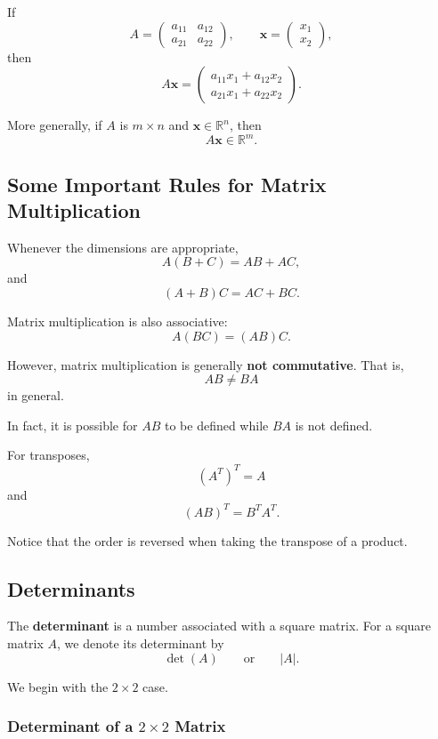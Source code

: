 \documentclass[11pt]{article}
\theoremstyle{definition}
\theoremstyle{plain}
\theoremstyle{remark}
\begin{document}
If
\[
A=
\begin{pmatrix}
a_{11}&a_{12}\\
a_{21}&a_{22}
\end{pmatrix},
\qquad
\mathbf{x}
=
\begin{pmatrix}
x_1\\
x_2
\end{pmatrix},
\]
then
\[
A\mathbf{x}
=
\begin{pmatrix}
a_{11}x_1+a_{12}x_2\\
a_{21}x_1+a_{22}x_2
\end{pmatrix}.
\]

More generally, if $A$ is $m\times n$ and $\mathbf{x}\in\mathbb{R}^n$,
then
\[
A\mathbf{x}\in\mathbb{R}^m.
\]


\subsection*{Some Important Rules for Matrix Multiplication}

Whenever the dimensions are appropriate,
\[
A(B+C)=AB+AC,
\]
and
\[
(A+B)C=AC+BC.
\]

Matrix multiplication is also associative:
\[
A(BC)=(AB)C.
\]

However, matrix multiplication is generally \textbf{not commutative}.
That is,
\[
{
AB\neq BA
}
\]
in general.

In fact, it is possible for $AB$ to be defined while $BA$ is not
defined.

For transposes,
\[
(A^T)^T=A
\]
and
\[
{
(AB)^T=B^TA^T.
}
\]

Notice that the order is reversed when taking the transpose of a
product.


\subsection*{Determinants}

The \textbf{determinant} is a number associated with a square matrix.
For a square matrix $A$, we denote its determinant by
\[
\det(A)
\qquad\text{or}\qquad
|A|.
\]

We begin with the $2\times2$ case.


\subsubsection*{Determinant of a $2\times2$ Matrix}
\end{document}
